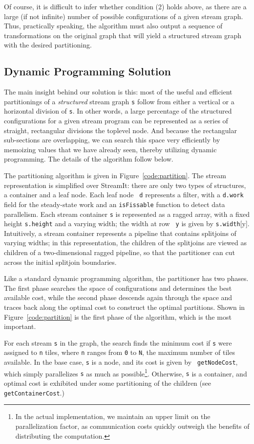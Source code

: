 Of course, it is difficult to infer whether condition (2) holds above,
as there are a large (if not infinite) number of possible
configurations of a given stream graph.  Thus, practically speaking,
the algorithm must also output a sequence of transformations on the
original graph that will yield a structured stream graph with the
desired partitioning.

\subsection{Dynamic Programming Solution}

The main insight behind our solution is this: most of the useful and
efficient partitionings of a {\it structured} stream graph {\tt s}
follow from either a vertical or a horizontal division of {\tt s}.  In
other words, a large percentage of the structured configurations for a
given stream program can be represented as a series of straight,
rectangular divisions the toplevel node.  And because the rectangular
sub-sections are overlapping, we can search this space very
efficiently by memoizing values that we have already seen, thereby
utilizing dynamic programming.  The details of the algorithm follow
below.

The partitioning algorithm is given in Figure~\ref{code:partition}.  The
stream representation is simplified over StreamIt: there are only two
types of structures, a container and a leaf node.  Each leaf node {\tt
d} represents a filter, with a {\tt d.work} field for the steady-state
work and an {\tt isFissable} function to detect data parallelism.
Each stream container {\tt s} is represented as a ragged array, with a
fixed height {\tt s.height} and a varying width; the width at row {\tt
y} is given by {\tt s.width}[y].  Intuitively, a stream container
represents a pipeline that contains splitjoins of varying widths; in
this representation, the children of the splitjoins are viewed as
children of a two-dimensional ragged pipeline, so that the partitioner
can cut across the initial splitjoin boundaries.

Like a standard dynamic programming algorithm, the partitioner has two
phases.  The first phase searches the space of configurations and
determines the best available cost, while the second phase descends
again through the space and traces back along the optimal cost to
construct the optimal partitions.  Shown in Figure~\ref{code:partition} is
the first phase of the algorithm, which is the most important.

For each stream {\tt s} in the graph, the search finds the minimum
cost if {\tt s} were assigned to {\tt n} tiles, where {\tt n} ranges
from {\tt 0} to {\tt N}, the maximum number of tiles available.  In
the base case, {\tt s} is a node, and its cost is given by {\tt
getNodeCost}, which simply parallelizes {\tt s} as much as
possible\footnote{In the actual implementation, we maintain an upper
limit on the parallelization factor, as communication costs quickly
outweigh the benefits of distributing the computation.}.  Otherwise,
{\tt s} is a container, and optimal cost is exhibited under some
partitioning of the children (see {\tt getContainerCost}.)

